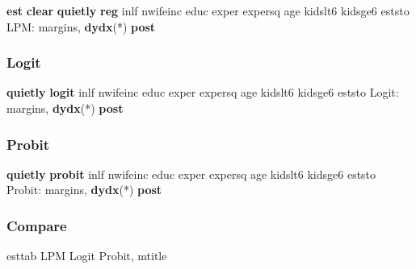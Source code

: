 \documentclass[
]{book}
\newenvironment{Shaded}{\begin{snugshade}}{\end{snugshade}}
\newcommand{\KeywordTok}[1]{\textcolor[rgb]{0.13,0.29,0.53}{\textbf{#1}}}
\newcommand{\NormalTok}[1]{#1}
\begin{document}
\begin{Shaded}
\begin{Highlighting}[]
\KeywordTok{est} \KeywordTok{clear}
\KeywordTok{quietly} \KeywordTok{reg}\NormalTok{ inlf nwifeinc educ exper expersq age kidslt6 kidsge6}
\NormalTok{eststo LPM: margins, }\KeywordTok{dydx}\NormalTok{(*) }\KeywordTok{post} 
\end{Highlighting}
\end{Shaded}

\subsubsection*{Logit}\label{logit}

\begin{Shaded}
\begin{Highlighting}[]
\KeywordTok{quietly} \KeywordTok{logit}\NormalTok{ inlf nwifeinc educ exper expersq age kidslt6 kidsge6}
\NormalTok{eststo Logit: margins, }\KeywordTok{dydx}\NormalTok{(*) }\KeywordTok{post}
\end{Highlighting}
\end{Shaded}

\subsubsection*{Probit}\label{probit}

\begin{Shaded}
\begin{Highlighting}[]
\KeywordTok{quietly} \KeywordTok{probit}\NormalTok{ inlf nwifeinc educ exper expersq age kidslt6 kidsge6}
\NormalTok{eststo Probit: margins, }\KeywordTok{dydx}\NormalTok{(*) }\KeywordTok{post}
\end{Highlighting}
\end{Shaded}

\subsubsection*{Compare}\label{compare}

\begin{Shaded}
\begin{Highlighting}[]
\NormalTok{esttab LPM Logit Probit, mtitle}
\end{Highlighting}
\end{Shaded}
\end{document}

